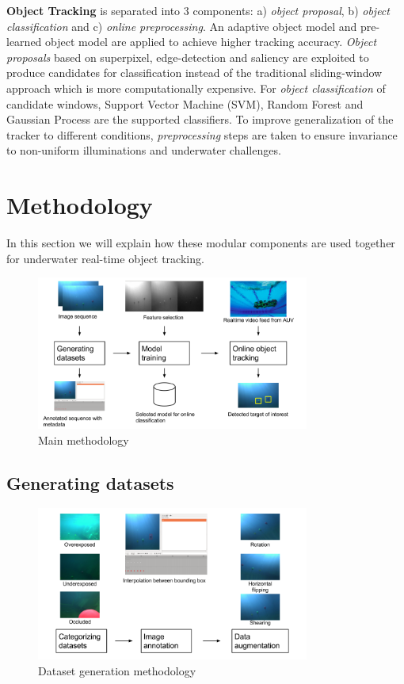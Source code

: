 \documentclass[hyp]{socreport}
\begin{document}
\textbf{Object Tracking} is separated into 3 components: a) \textit{object
  proposal}, b) \textit{object classification} and c) \textit{online preprocessing}. An
adaptive object model and pre-learned object model are applied to achieve higher
tracking accuracy. \textit{Object proposals} based on superpixel, edge-detection
and saliency are exploited to produce candidates for classification instead of
the traditional sliding-window approach which is more computationally expensive.
For \textit{object classification} of candidate windows, Support Vector Machine
(SVM), Random Forest and Gaussian Process are the supported classifiers.
To improve generalization of the tracker to different conditions,
\textit{preprocessing} steps are taken to ensure invariance to non-uniform
illuminations and underwater challenges.

\newpage
\section{Methodology}

In this section we will explain how these modular components are used together
for underwater real-time object tracking.

\begin{figure}[H]
\centering
  \includegraphics[width=0.8\textwidth, height=0.3\textheight]{method.png}
  \caption{Main methodology}
  \label{fig:main_methodology}
\end{figure}

\subsection{Generating datasets}

\begin{figure}[H]
\centering
  \includegraphics[width=0.8\textwidth, height=0.3\textheight]{dataset_method.png}
  \caption{Dataset generation methodology}
  \label{fig:dataset_methodology}
\end{figure}
\end{document}
